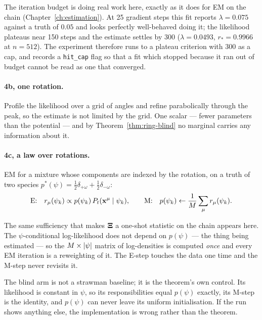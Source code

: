 \begin{pitfall}
The iteration budget is doing real work here, exactly as it does for EM on the chain
(Chapter~\ref{ch:estimation}). At 25 gradient steps this fit reports $\lambda = 0.075$ against a
truth of $0.05$ and looks perfectly well-behaved doing it; the likelihood plateaus near 150 steps
and the estimate settles by 300 ($\lambda = 0.0493$, $r_* = 0.9966$ at $n=512$). The experiment
therefore runs to a plateau criterion with 300 as a cap, and records a \texttt{hit\_cap} flag so
that a fit which stopped because it ran out of budget cannot be read as one that converged.
\end{pitfall}

\paragraph{4b, one rotation.} Profile the likelihood over a grid of angles and refine
parabolically through the peak, so the estimate is not limited by the grid. One scalar --- fewer
parameters than the potential --- and by Theorem~\ref{thm:ring-blind} no marginal carries any
information about it.

\paragraph{4c, a law over rotations.} EM for a mixture whose components are indexed by the
rotation, on a truth of two species $p^*(\psi) = \tfrac12\delta_{+\omega} +
\tfrac12\delta_{-\omega}$:
\[
\text{E:}\quad r_\mu(\psi_k) \propto p(\psi_k)\,P_t(\mathbf{x}^\mu\mid\psi_k),
\qquad
\text{M:}\quad p(\psi_k) \leftarrow \frac{1}{M}\sum_\mu r_\mu(\psi_k).
\]

\begin{intuition}
The same sufficiency that makes $\mathbf{\Xi}$ a one-shot statistic on the chain appears here. The
$\psi$-conditional log-likelihood does not depend on $p(\psi)$ --- the thing being estimated ---
so the $M\times|\psi|$ matrix of log-densities is computed \emph{once} and every EM iteration
is a reweighting of it. The E-step touches the data one time and the M-step never revisits it.
\end{intuition}

The blind arm is not a strawman baseline; it is the theorem's own control. Its likelihood is
constant in $\psi$, so its responsibilities equal $p(\psi)$ exactly, its M-step is the identity,
and $p(\psi)$ can never leave its uniform initialisation. If the run shows anything else, the
implementation is wrong rather than the theorem.

